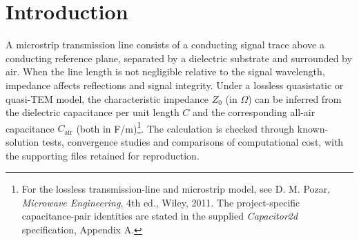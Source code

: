 \documentclass[11pt]{article}
\newcommand{\Cair}{C_{\mathrm{air}}}
\newcommand{\Zzero}{Z_0}
\begin{document}
\begin{abstract}
The capacitance of a microstrip cross-section provides an estimate of its impedance, but the finite-element result depends on the outer boundary and the resolution near conductor corners. We modelled a finite-thickness trace using two-dimensional electrostatics and conforming triangular $P_1$ elements: continuous functions that are affine within each triangle.

We checked the solver with a manufactured solution and examined domain truncation and mesh convergence. The uniform-mesh energy error gave a fitted rate of $0.623$, below the smooth-problem rate of one. An initial corner-grading comparison exposed a problem in the cross-mesh error integration. We then compared uniform, graded and flux-jump adaptive refinement using a separately tested triangle-overlay calculation.

At a relative energy error of $0.30$, adaptivity needed approximately $224$ degrees of freedom (DOFs), compared with $273$ for uniform refinement and $349$ for grading. The reduction in DOFs came with a higher cumulative computation time.

The selected uniform mesh, labelled M7, gave a dielectric capacitance of $120.620\,\mathrm{pF/m}$. Reusing exactly the same mesh for the all-air calculation gave $35.9682\,\mathrm{pF/m}$, an effective permittivity of $3.3535$ and a characteristic impedance of $50.642\,\Omega$. Hammerstad--Jensen and IPC-2141 gave approximate impedance values of $50.201\,\Omega$ and $49.393\,\Omega$, respectively.

The comparison separates the size of the final approximation from the work required to obtain it, with spatial and domain sensitivities reported alongside the engineering result.
\end{abstract}
\tableofcontents
\newpage
{}

\section{Introduction}
A microstrip transmission line consists of a conducting signal trace above a conducting reference plane, separated by a dielectric substrate and surrounded by air. When the line length is not negligible relative to the signal wavelength, impedance affects reflections and signal integrity. Under a lossless quasistatic or quasi-TEM model, the characteristic impedance $\Zzero$ (in $\Omega$) can be inferred from the dielectric capacitance per unit length $C$ and the corresponding all-air capacitance $\Cair$ (both in F/m)\footnote{For the lossless transmission-line and microstrip model, see D. M. Pozar, \emph{Microwave Engineering}, 4th ed., Wiley, 2011. The project-specific capacitance-pair identities are stated in the supplied \emph{Capacitor2d} specification, Appendix A.}. The calculation is checked through known-solution tests, convergence studies and comparisons of computational cost, with the supporting files retained for reproduction.
\end{document}
